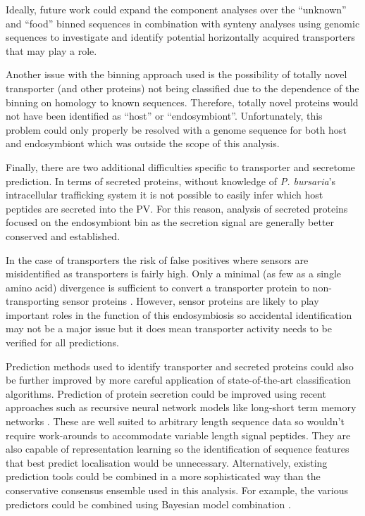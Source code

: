 Ideally, future work could expand the component analyses over the 
``unknown'' and ``food'' binned sequences in combination with synteny
analyses using genomic sequences to investigate and identify
potential horizontally acquired transporters that may play a role.

Another issue with the binning approach used is the possibility
of totally novel transporter (and other proteins) not being classified
due to the dependence of the binning on homology to known sequences.
Therefore, totally novel proteins would not have been identified as 
``host'' or ``endosymbiont''.  Unfortunately, this problem 
could only properly be resolved with a 
genome sequence for both host and endosymbiont which was outside
the scope of this analysis. 

Finally, there are two additional difficulties specific to transporter and secretome prediction.
In terms of secreted proteins, without knowledge of \textit{P. bursaria}'s intracellular trafficking
system it is not possible to easily infer which host peptides are secreted into
the PV.  For this reason, analysis of secreted proteins focused on 
the endosymbiont bin as the secretion signal are generally better conserved
and established. 

In the case of transporters the risk of false positives where sensors are 
misidentified as transporters is fairly high. 
Only a minimal (as few as
a single amino acid) divergence is sufficient to convert a transporter protein 
to non-transporting sensor proteins \citep{Lalonde1999,Bianchi2010}.
However, sensor proteins are likely to play important roles in the function
of this endosymbiosis so accidental identification may not be a major issue but
it does mean transporter activity needs to be verified for all predictions.


Prediction methods used to identify
transporter and secreted proteins 
could also be further improved by more careful 
application of state-of-the-art classification
algorithms. 
Prediction of protein secretion could be improved
using recent approaches such as recursive
neural network models like long-short term memory networks 
\citep{Hochreiter1997,Greff2015}.
These are well suited to arbitrary length sequence data so wouldn't 
require work-arounds to accommodate variable length signal 
peptides.  They are also capable of representation learning
so the identification of sequence features that best
predict localisation would be unnecessary. 
Alternatively, existing prediction tools could be combined
in a more sophisticated way than the conservative consensus
ensemble used in this analysis.  For example,
the various predictors could be combined using Bayesian
model combination \citep{Monteith2011}.


